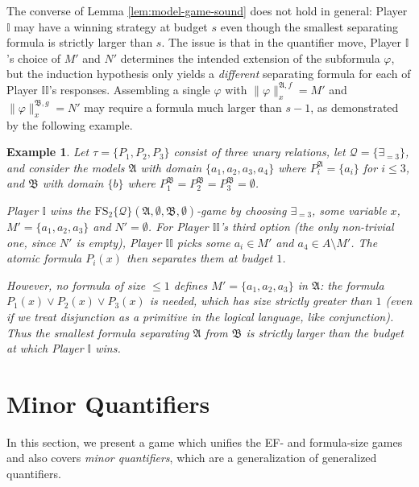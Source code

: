 \documentclass{article}
\newtheorem{example}[theorem]{Example}
\theoremstyle{definition}
\begin{document}
The converse of Lemma \ref{lem:model-game-sound} does not hold in general: Player $\mathbb{I}$ may have a winning strategy at budget $s$ even though the smallest separating formula is strictly larger than $s$. The issue is that in the quantifier move, Player $\mathbb{I}$'s choice of $M'$ and $N'$ determines the intended extension of the subformula $\varphi$, but the induction hypothesis only yields a \textit{different} separating formula for each of Player $\mathbb{II}$'s responses. Assembling a single $\varphi$ with $\|\varphi\|^{\mathfrak{A},f}_x = M'$ and $\|\varphi\|^{\mathfrak{B},g}_x = N'$ may require a formula much larger than $s - 1$, as demonstrated by the following example.

\begin{example}\label{ex:model-game-gap}
    Let $\tau=\{P_1,P_2,P_3\}$ consist of three unary relations, let
    $\mathcal{Q}=\{\exists_{=3}\}$, and consider the models
    $\mathfrak{A}$ with domain $\{a_1,a_2,a_3,a_4\}$ where
    $P_i^{\mathfrak{A}}=\{a_i\}$ for $i\leq 3$, and $\mathfrak{B}$ with
    domain $\{b\}$ where
    $P_1^{\mathfrak{B}}=P_2^{\mathfrak{B}}=P_3^{\mathfrak{B}}=\emptyset$.

    Player $\mathbb{I}$ wins the
    $\mathrm{FS}_2\{\mathcal{Q}\}(\mathfrak{A},\emptyset,\mathfrak{B},
    \emptyset)$-game by choosing $\exists_{= 3}$, some variable $x$,
    $M'=\{a_1,a_2,a_3\}$ and $N'=\emptyset$. For Player $\mathbb{II}$'s
    third option (the only non-trivial one, since $N'$ is empty), Player
    $\mathbb{II}$ picks some $a_i\in M'$ and $a_4\in A\setminus M'$. The
    atomic formula $P_i(x)$ then separates them at budget $1$.

    However, no formula of size $\leq 1$ defines
    $M'=\{a_1,a_2,a_3\}$ in $\mathfrak{A}$: the formula
    $P_1(x)\lor P_2(x)\lor P_3(x)$ is needed, which
    has size strictly greater than $1$ (even if we treat disjunction as a primitive in the logical language, like conjunction). Thus the smallest formula separating
    $\mathfrak{A}$ from $\mathfrak{B}$ is strictly larger than the budget
    at which Player $\mathbb{I}$ wins.
\end{example}

\section{Minor Quantifiers}

In this section, we present a game which unifies the EF- and formula-size games and also covers \textit{minor quantifiers}, which are a generalization of generalized quantifiers. %
\end{document}

